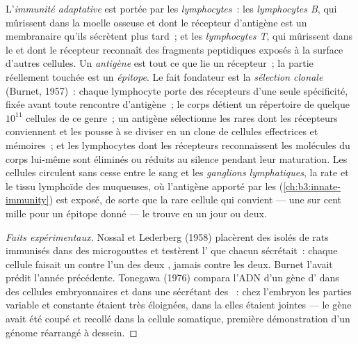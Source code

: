 \begin{definition}\label{def:b3:adaptive-immunity:lymphocytes}
L'\emph{immunité adaptative} est portée par les \emph{lymphocytes}~: les
\emph{lymphocytes B}, qui mûrissent dans la moelle osseuse et dont le
récepteur d'antigène est un \emph{} membranaire qu'ils
sécrètent plus tard~; et les \emph{lymphocytes T}, qui mûrissent dans le
 et dont le récepteur reconnaît des fragments peptidiques exposés
à la surface d'autres cellules. Un \emph{antigène} est tout ce que lie
un récepteur~; la partie réellement touchée est un \emph{épitope}. Le
fait fondateur est la \emph{sélection clonale} (Burnet, 1957)~: chaque
lymphocyte porte des récepteurs d'une seule spécificité, fixée avant
toute rencontre d'antigène~; le corps détient un répertoire de quelque
$10^{11}$ cellules de ce genre~; un antigène sélectionne les rares dont
les récepteurs conviennent et les pousse à se diviser en un clone de
cellules effectrices et mémoires~; et les lymphocytes dont les
récepteurs reconnaissent les molécules du corps lui-même sont éliminés
ou réduits au silence pendant leur maturation. Les cellules circulent
sans cesse entre le sang et les \emph{ganglions lymphatiques}, la rate
et le tissu lymphoïde des muqueuses, où l'antigène apporté par les
 (\cref{ch:b3:innate-immunity}) est exposé, de
sorte que la rare cellule qui convient --- une sur cent mille pour un
épitope donné --- le trouve en un jour ou deux.
\end{definition}

\begin{proof}[Faits expérimentaux]
Nossal et Lederberg (1958) placèrent des  isolés de rats
immunisés dans des microgouttes et testèrent l' que chacun
sécrétait~: chaque cellule faisait un  contre l'un des deux
, jamais contre les deux. Burnet l'avait prédit l'année
précédente. Tonegawa (1976) compara l'ADN d'un gène d' dans des
cellules embryonnaires et dans une  sécrétant des ~: chez
l'embryon les parties variable et constante étaient très éloignées, dans
la  elles étaient jointes --- le gène avait été coupé et recollé
dans la cellule somatique, première démonstration d'un génome réarrangé
à dessein.
\end{proof}

